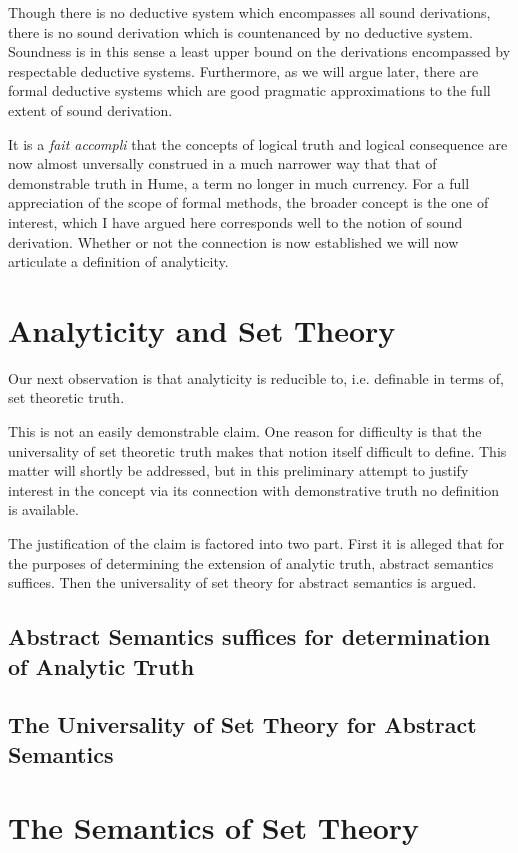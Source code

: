 \documentclass[numreferences]{rbjk}
\begin{document}
\begin{article}
{Though there is no deductive system which encompasses all sound derivations, there is no sound derivation which is countenanced by no deductive system.
Soundness is in this sense a least upper bound on the derivations encompassed by respectable deductive systems.
Furthermore, as we will argue later, there are formal deductive systems which are good pragmatic approximations to the full extent of sound derivation.

It is a {\it fait accompli} that the concepts of logical truth and logical consequence are now almost unversally construed in a much narrower way that that of demonstrable truth in Hume, a term no longer in much currency.
For a full appreciation of the scope of formal methods, the broader concept is the one of interest, which I have argued here corresponds well to the notion of sound derivation.
Whether or not the connection is now established we will now articulate a definition of analyticity.

}

\section{Analyticity and Set Theory}

Our next observation is that analyticity is reducible to, i.e. definable in terms of, set theoretic truth.

This is not an easily demonstrable claim.
One reason for difficulty is that the universality of set theoretic truth makes that notion itself difficult to define.
This matter will shortly be addressed, but in this preliminary attempt to justify interest in the concept via its connection with demonstrative truth no definition is available.

The justification of the claim is factored into two part.
First it is alleged that for the purposes of determining the extension of analytic truth, abstract semantics suffices.
Then the universality of set theory for abstract semantics is argued.

\subsection{Abstract Semantics suffices for determination of Analytic Truth}



\subsection{The Universality of Set Theory for Abstract Semantics}


\section{The Semantics of Set Theory}

%

%
%

\end{article}
\end{document}
